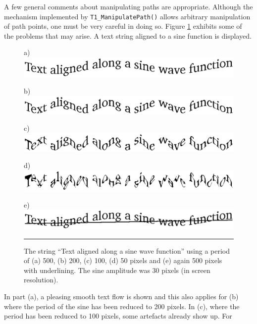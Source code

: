 A few general comments about manipulating paths are appropriate. Although the
mechanism implemented by \verb+T1_ManipulatePath()+ allows arbitrary
manipulation of path points, one must be very careful in doing so. Figure
\ref{figure:outlineproblems} exhibits some of the problems that may arise. A text
string aligned to a sine function is displayed.
\begin{figure}[t]
\hfill
a) \includegraphics[scale=0.5]{outlineproblems1} %
\hfill\break

\hfill
b) \includegraphics[scale=0.5]{outlineproblems2} %
\hfill\break

\hfill
c) \includegraphics[scale=0.5]{outlineproblems3} %
\hfill\break

\hfill
d) \includegraphics[scale=0.5]{outlineproblems4} %
\hfill\break

\hfill
e) \includegraphics[scale=0.5]{outlineproblems5} %
\hfill\break
\hrule\vskip3mm\small
\caption{\label{figure:outlineproblems}The string ``Text aligned along a sine wave
  function'' using a period of (a) 500, (b) 200, (c) 100, (d) 50 pixels and
  (e) again 500 pixels with underlining. The sine amplitude was 30 pixels 
  (in screen resolution).} 
\end{figure}
In part (a), a pleasing smooth text flow is shown and this also applies for
(b) where the period of the sine has been reduced to 200 pixels. In (c), where
the period has been reduced to 100 pixels, some artefacts already show up. For
